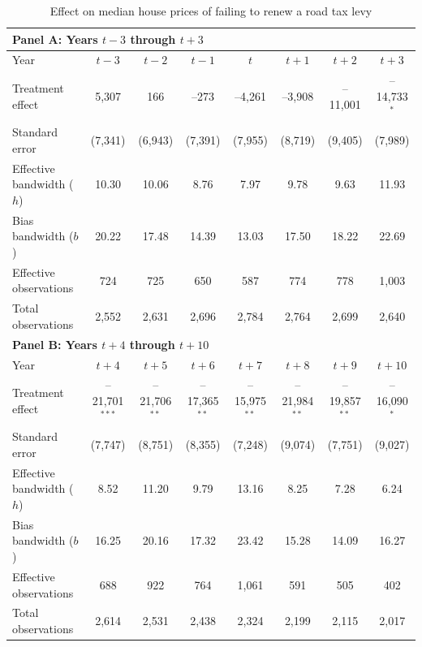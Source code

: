 \begin{table}[H]
  \centering
  \caption{Effect on median house prices of failing to renew a road tax levy}
  \label{tab:median_sale_amount}
  \begin{threeparttable}
  \small
  \setlength{\tabcolsep}{3pt}
    \begin{tabular*}{\textwidth}{@{\extracolsep{\fill}}p{3.2cm}ccccccc}
    \toprule
    \multicolumn{8}{l}{\textbf{Panel A: Years $t-3$ through $t+3$}}\\
    \midrule
    Year       & $t\!-\!3$ & $t\!-\!2$ & $t\!-\!1$ & $t$ & $t\!+\!1$ & $t\!+\!2$ & $t\!+\!3$\\
    \midrule
    Treatment effect           &  5,307 &     166 &    –273 &  –4,261 &  –3,908 & –11,001 & –14,733$^{*}$ \\
    Standard error             & (7,341)& (6,943)& (7,391) & (7,955) & (8,719) & (9,405) & (7,989) \\
    Effective bandwidth ($h$)  & 10.30  & 10.06 &  8.76  &  7.97  &  9.78  &  9.63  & 11.93  \\
    Bias bandwidth ($b$)       & 20.22  & 17.48 & 14.39  & 13.03  & 17.50  & 18.22  & 22.69  \\
    Effective observations     &   724  &   725  &   650  &   587  &   774  &   778  & 1,003  \\
    Total observations         & 2,552  & 2,631  & 2,696  & 2,784  & 2,764  & 2,699  & 2,640  \\
    \midrule
    \multicolumn{8}{l}{\textbf{Panel B: Years $t+4$ through $t+10$}}\\
    \midrule
    Year       & $t\!+\!4$ & $t\!+\!5$ & $t\!+\!6$ & $t\!+\!7$ & $t\!+\!8$ & $t\!+\!9$ & $t\!+\!10$\\
    \midrule
    Treatment effect           & –21,701$^{***}$ & –21,706$^{**}$ & –17,365$^{**}$ & –15,975$^{**}$ & –21,984$^{**}$ & –19,857$^{**}$ & –16,090$^{*}$ \\
    Standard error             &  (7,747)&  (8,751)&  (8,355)&  (7,248)&  (9,074)&  (7,751)&  (9,027) \\
    Effective bandwidth ($h$)  &   8.52 &  11.20 &   9.79 &  13.16 &   8.25 &   7.28 &   6.24 \\
    Bias bandwidth ($b$)       &  16.25 &  20.16 &  17.32 &  23.42 &  15.28 &  14.09 &  16.27 \\
    Effective observations     &    688 &    922 &    764 &  1,061 &    591 &    505 &    402 \\
    Total observations         &  2,614 &  2,531 &  2,438 &  2,324 &  2,199 &  2,115 &  2,017 \\

\end{tabular*}
\end{threeparttable}
\end{table}
